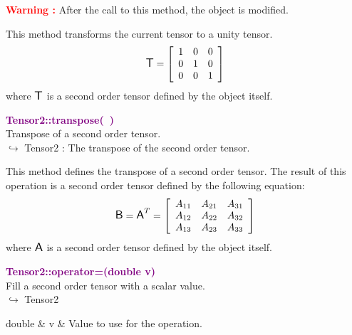 \hspace*{10mm}\textcolor{red}{\textbf{Warning :}} After the call to this method, the object is modified.

This method transforms the current tensor to a unity tensor.
\begin{equation*}
\mbox{\large\ensuremath{\mathsf{T}}}=\left[\begin{array}{ccc}
1&0&0\\
0&1&0\\
0&0&1
\end{array}\right]
\end{equation*}
where $\mbox{\large\ensuremath{\mathsf{T}}}$ is a second order tensor defined by the object itself.

\textcolor{purple}{\textbf{Tensor2::transpose(~)}}\label{Tensor2::transpose()}\\
Transpose of a second order tensor.\\ \hspace*{10mm}$\hookrightarrow$ Tensor2 : The transpose of the second order tensor.

This method defines the transpose of a second order tensor.
The result of this operation is a second order tensor defined by the following equation:
\begin{equation*}
\mbox{\large\ensuremath{\mathsf{B}}}=\mbox{\large\ensuremath{\mathsf{A}}}^T =\left[\begin{array}{ccc}
  A_{11} & A_{21} & A_{31}\\
  A_{12} & A_{22} & A_{32}\\
  A_{13} & A_{23} & A_{33}
  \end{array}\right]
\end{equation*}
where $\mbox{\large\ensuremath{\mathsf{A}}}$ is a second order tensor defined by the object itself.

\textcolor{purple}{\textbf{Tensor2::operator=(double v)}}\label{Tensor2::operator=(double v)}\\
Fill a second order tensor with a scalar value.\\ \hspace*{10mm}$\hookrightarrow$ Tensor2

\begin{tcolorbox}[width=\textwidth,myArgs,tabularx={ll|R}]
double & v & Value to use for the operation.
\end{tcolorbox}

